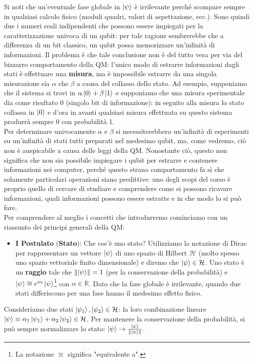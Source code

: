 \noindent Si noti che un'eventuale fase globale in $\ket{\psi}$ è irrilevante perché scompare sempre in qualsiasi calcolo fisico (moduli quadri, valori di aspettazione, ecc.). Sono quindi due i numeri reali indipendenti che possono essere impiegati per la caratterizzazione univoca di un qubit: per tale ragione sembrerebbe che a differenza di un bit classico, un qubit possa memorizzare un'infinità di informazioni. Il problema è che tale conclusione non è del tutto vera per via del bizzarro comportamento della QM: l'unico modo di estrarre informazioni dagli stati è effettuare una \textbf{misura}, ma è impossibile estrarre da una singola misurazione sia $\alpha$ che $\beta$ a causa del collasso dello stato. Ad esempio, supponiamo che il sistema si trovi in $\alpha \ket{0} + \beta \ket{1}$ e supponiamo che una misura sperimentale dia come risultato 0 (singolo bit di informazione): in seguito alla misura lo stato collassa in $\ket{0}$ e d'ora in avanti qualsiasi misura effettuata su questo sistema produrrà sempre $0$ con probabilità 1. \\
\noindent Per determinare univocamente $\alpha$ e $\beta$ si necessiterebbero un'infinità di esperimenti su un'infinità di stati tutti preparati nel medesimo qubit, ma, come vedremo, ciò non è auspicabile a causa delle leggi della QM. Nonostante ciò, questo non significa che non sia possibile impiegare i qubit per estrarre e contenere informazioni nei computer, perché questo strano comportamento fa sì che solamente particolari operazioni siano predittive: uno degli scopi del corso è proprio quello di cercare di studiare e comprendere come si possono ricavare informazioni, quali informazioni possono essere estratte e in che modo lo si può fare. \\
\noindent Per comprendere al meglio i concetti che introdurremo cominciamo con un riassunto dei principi generali della QM:
\begin{itemize}
    \item \textbf{I Postulato} (\textbf{Stato}): Che cos'è uno stato? Utilizziamo la notazione di Dirac per rappresentare un vettore $\ket{\psi}$ di uno spazio di Hilbert $\mathcal{H}$ (molto spesso uno spazio vettoriale finito dimensionale) e diremo che $\ket{\psi} \in \mathcal{H}$. Uno stato è un \textbf{raggio} tale che $\norm{\ket{\psi}} = 1$ (per la conservazione della probabilità) e $\ket{\psi} \cong e^{i \alpha} \ket{\psi}$\footnote{La notazione $\cong$ significa "equivalente a".} con $\alpha \in \mathbb{R}$. Dato che la fase globale è irrilevante, quando due stati differiscono per una fase hanno il medesimo effetto fisico. 
\end{itemize}
Consideriamo due stati $\ket{\psi_1}, \ket{\psi_2} \in \mathcal{H}$: la loro combinazione lineare $\ket{\psi} \equiv \alpha_1 \ket{\psi_1} + \alpha_2 \ket{\psi_2} \in \mathcal{H}$. Per mantenere la conservazione della probabilità, si può sempre normalizzare lo stato: $\ket{\psi} \to \frac{\ket{\psi}}{\norm{\ket{\psi}}}$. 

